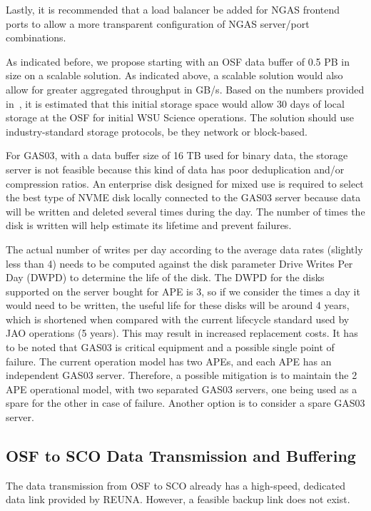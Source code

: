 Lastly, it is recommended that a load balancer be added for NGAS frontend ports to allow a more transparent configuration of NGAS server/port combinations.

As indicated before, we propose starting with an OSF data buffer of 0.5 PB in size on a scalable solution. As indicated above, a scalable solution would also allow for greater aggregated throughput in GB/s. Based on the numbers provided in~\cite{drru_mean, drru_peak}, it is estimated that this initial storage space would allow 30 days of local storage at the OSF for initial WSU Science operations. The solution should use industry-standard storage protocols, be they network or block-based.

For GAS03, with a data buffer size of 16 TB used for binary data, the storage server is not feasible because this kind of data has poor deduplication and/or compression ratios. An enterprise disk designed for mixed use is required to select the best type of \ac{NVME} disk locally connected to the GAS03 server because data will be written and deleted several times during the day. The number of times the disk is written will help estimate its lifetime and prevent failures.

The actual number of writes per day according to the average data rates (slightly less than 4) needs to be computed against the disk parameter Drive Writes Per Day (DWPD) to determine the life of the disk. The DWPD for the disks supported on the server bought for APE is 3, so if we consider the times a day it would need to be written, the useful life for these disks will be around 4 years, which is shortened when compared with the current lifecycle standard used by JAO operations (5 years). This may result in increased replacement costs. It has to be noted that GAS03 is critical equipment and a possible single point of failure. The current operation model has two APEs, and each APE has an independent GAS03 server. Therefore, a possible mitigation is to maintain the 2 APE operational model, with two separated GAS03 servers, one being used as a spare for the other in case of failure. Another option is to consider a spare GAS03 server.


\subsection{OSF to SCO Data Transmission and Buffering} %
\label{ssub:osf_to_sco_data_transmission_and_buffering}
The data transmission from OSF to SCO already has a high-speed, dedicated data link provided by REUNA. However, a feasible backup link does not exist.

